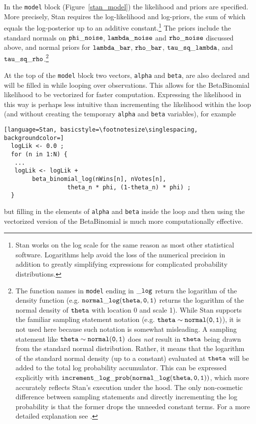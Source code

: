 In the {\tt model} block (Figure~\ref{stan_model}) the likelihood and priors are specified. More 
precisely, Stan requires the log-likelihood and log-priors, the sum of which equals the log-posterior 
up to an additive constant.\footnote{Stan works on the log scale for the same reason as most 
other statistical software. Logarithms help avoid the loss of the numerical precision in addition to 
greatly simplifying expressions for complicated probability distributions.}
The priors include the standard normals on ${\tt phi\_noise}$, ${\tt lambda\_noise}$ and ${\tt rho\_noise}$ 
discussed above, and normal priors for ${\tt lambda\_bar}$, ${\tt rho\_bar}$, ${\tt tau\_sq\_lambda}$, 
and ${\tt tau\_sq\_rho}$.\footnote{The function names in {\tt model} 
ending in ${\tt\_log}$ return the logarithm of the density function (e.g. ${\tt normal\_log(theta,0,1)}$ 
returns the logarithm of the normal density of ${\tt theta}$  with location 0 and scale 1). While Stan  
supports the familiar sampling statement notation (e.g. ${\tt theta \sim normal(0,1)}$), it is not 
used here because such notation is somewhat misleading. A sampling statement like 
${\tt theta \sim normal(0,1)}$ does {\it not} result in ${\tt theta}$ being drawn from the standard 
normal distribution. Rather, it means that the logarithm of the standard normal density (up to a constant) 
evaluated at ${\tt theta}$ will be added to the total log probability accumulator. This can be expressed 
explicitly with ${\tt increment\_log\_prob(normal\_log(theta,0,1))}$, which more accurately reflects 
Stan's execution under the hood. The only non-cosmetic difference between sampling statements and directly 
incrementing the log probability is that the former drops the unneeded constant terms. For a more detailed 
explanation see .}  

At the top of the {\tt model} block two vectors, {\tt alpha} and {\tt beta}, are also declared 
and will be filled in while looping over observations. This allows for the BetaBinomial likelihood 
to be vectorized for faster computation. Expressing the likelihood in this way is perhaps less 
intuitive than incrementing the likelihood within the loop (and without creating the temporary 
{\tt alpha} and {\tt beta} variables), for example

\begin{lstlisting}[language=Stan, basicstyle=\footnotesize\singlespacing, backgroundcolor=]
  logLik <- 0.0 ;
  for (n in 1:N) {
   ...
   logLik <- logLik +
   		beta_binomial_log(nWins[n], nVotes[n], 
   				  theta_n * phi, (1-theta_n) * phi) ;
  }
\end{lstlisting}
%
\noindent but filling in the elements of {\tt alpha} and {\tt beta} inside the loop and then using the 
vectorized version of the BetaBinomial is much more computationally effective. 

